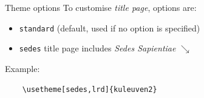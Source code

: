 \documentclass[11pt,t]{beamer}
\begin{document}
\begin{frame}[fragile]{Theme options}  %
To customise \emph{title page}, options are:
\begin{itemize}
	\item \texttt{standard} \quad (default, used if no option is specified) 
	\item \texttt{sedes} \qquad title page includes \textit{Sedes Sapientiae} $\searrow$
\end{itemize}

\vspace{24pt}
Example:
	\begin{verbatim}
	\usetheme[sedes,lrd]{kuleuven2}
	\end{verbatim}

\end{frame}
\end{document}
